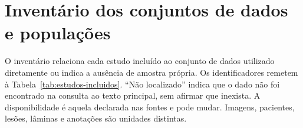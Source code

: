 \chapter{Inventário dos conjuntos de dados e populações}
\label{apend:inventario-datasets}

O inventário relaciona cada estudo incluído ao conjunto de dados utilizado diretamente ou indica a ausência de amostra própria. Os identificadores remetem à Tabela~\ref{tab:estudos-incluidos}. ``Não localizado'' indica que o dado não foi encontrado na consulta ao texto principal, sem afirmar que inexista. A disponibilidade é aquela declarada nas fontes e pode mudar. Imagens, pacientes, lesões, lâminas e anotações são unidades distintas.

